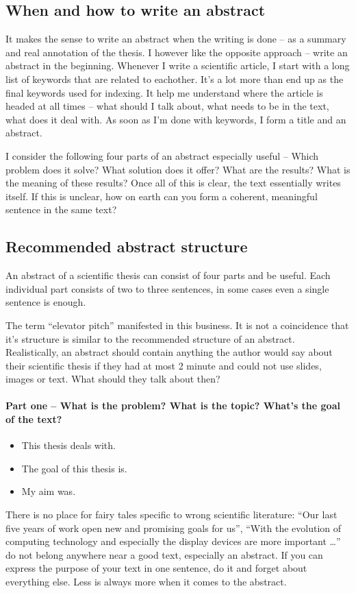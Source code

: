 \subsection*{When and how to write an abstract}
It makes the sense to write an abstract when the writing is done -- as a summary and real annotation of the thesis.
I however like the opposite approach -- write an abstract in the beginning. Whenever I write a scientific article, I start with a long list of keywords that are related to eachother. It's a lot more than end up as the final keywords used for indexing. It help me understand where the article is headed at all times -- what should I talk about, what needs to be in the text, what does it deal with. As soon as I'm done with keywords, I form a title and an abstract.

I consider the following four parts of an abstract especially useful -- Which problem does it solve? What solution does it offer? What are the results? What is the meaning of these results? Once all of this is clear, the text essentially writes itself. If this is unclear, how on earth can you form a coherent, meaningful sentence in the same text?


\subsection*{Recommended abstract structure}
An abstract of a scientific thesis can consist of four parts and be useful. Each individual part consists of two to three sentences, in some cases even a single sentence is enough.

The term ``elevator pitch'' manifested in this business. It is not a coincidence that it's structure is similar to the recommended structure of an abstract. Realistically, an abstract should contain anything the author would say about their scientific thesis if they had at most 2 minute and could not use slides, images or text. What should they talk about then?

\paragraph{Part one -- What is the problem? What is the topic? What's the goal of the text?}
\begin{itemize}
  \item{This thesis deals with.}
  \item{The goal of this thesis is.}
  \item{My aim was.}
\end{itemize}
There is no place for fairy tales specific to wrong scientific literature: ``Our last five years of work open new and promising goals for us'', ``With the evolution of computing technology and especially the display devices are more important \ldots'' do not belong anywhere near a good text, especially an abstract. If you can express the purpose of your text in one sentence, do it and forget about everything else. Less is always more when it comes to the abstract.

